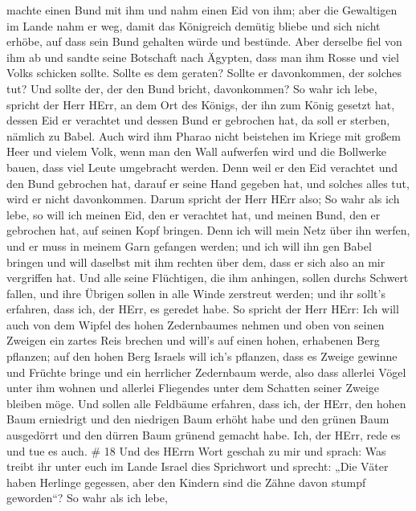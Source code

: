machte einen Bund mit ihm und nahm einen Eid von ihm; aber die
Gewaltigen im Lande nahm er weg,  damit das Königreich
demütig bliebe und sich nicht erhöbe, auf dass sein Bund gehalten würde
und bestünde.  Aber derselbe fiel von ihm ab und sandte
seine Botschaft nach Ägypten, dass man ihm Rosse und viel Volks schicken
sollte. Sollte es dem geraten? Sollte er davonkommen, der solches tut?
Und sollte der, der den Bund bricht, davonkommen?  So wahr
ich lebe, spricht der Herr HErr, an dem Ort des Königs, der ihn zum
König gesetzt hat, dessen Eid er verachtet und dessen Bund er gebrochen
hat, da soll er sterben, nämlich zu Babel.  Auch wird ihm
Pharao nicht beistehen im Kriege mit großem Heer und vielem Volk, wenn
man den Wall aufwerfen wird und die Bollwerke bauen, dass viel Leute
umgebracht werden.  Denn weil er den Eid verachtet und den
Bund gebrochen hat, darauf er seine Hand gegeben hat, und solches alles
tut, wird er nicht davonkommen.  Darum spricht der Herr
HErr also; So wahr als ich lebe, so will ich meinen Eid, den er
verachtet hat, und meinen Bund, den er gebrochen hat, auf seinen Kopf
bringen.  Denn ich will mein Netz über ihn werfen, und er
muss in meinem Garn gefangen werden; und ich will ihn gen Babel bringen
und will daselbst mit ihm rechten über dem, dass er sich also an mir
vergriffen hat.  Und alle seine Flüchtigen, die ihm
anhingen, sollen durchs Schwert fallen, und ihre Übrigen sollen in alle
Winde zerstreut werden; und ihr sollt's erfahren, dass ich, der HErr, es
geredet habe.  So spricht der Herr HErr: Ich will auch von
dem Wipfel des hohen Zedernbaumes nehmen und oben von seinen Zweigen ein
zartes Reis brechen und will's auf einen hohen, erhabenen Berg pflanzen;
 auf den hohen Berg Israels will ich's pflanzen, dass es
Zweige gewinne und Früchte bringe und ein herrlicher Zedernbaum werde,
also dass allerlei Vögel unter ihm wohnen und allerlei Fliegendes unter
dem Schatten seiner Zweige bleiben möge.  Und sollen alle
Feldbäume erfahren, dass ich, der HErr, den hohen Baum erniedrigt und
den niedrigen Baum erhöht habe und den grünen Baum ausgedörrt und den
dürren Baum grünend gemacht habe. Ich, der HErr, rede es und tue es
auch. \# 18  Und des HErrn Wort geschah zu mir und sprach:
 Was treibt ihr unter euch im Lande Israel dies Sprichwort
und sprecht: „Die Väter haben Herlinge gegessen, aber den Kindern sind
die Zähne davon stumpf geworden``?  So wahr als ich lebe,
